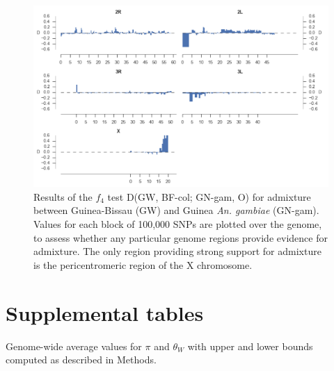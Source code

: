 \begin{refsection}
\clearpage
\begin{figure}[h!]
\centering
\includegraphics[width=1.1\textwidth,center]{artwork/chapter4/gwf4.pdf}
\caption{Results of the $f_4$ test D(GW, BF-col; GN-gam, O) for admixture between Guinea-Bissau (GW) and Guinea \textit{An. gambiae} (GN-gam).
%
Values for each block of 100,000 SNPs are plotted over the genome, to assess whether any particular genome regions provide evidence for admixture.
%
The only region providing strong support for admixture is the pericentromeric region of the X chromosome.
%
}
\label{fig:gwf4}
\end{figure}


\clearpage
\section{Supplemental tables}\label{sec:ch4-supplemental-tables}


\begin{table}[h]
\begin{center}
\begin{threeparttable}

\caption{Genome-wide average values for $\pi$ and $\theta_{W}$ with upper and lower bounds computed as described in Methods.
}

\label{table:pirange}


\end{threeparttable}
\end{center}
\end{table}
\end{refsection}
